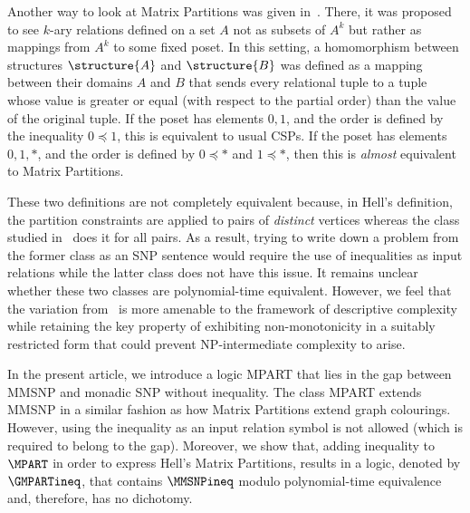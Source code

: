 \documentclass{lmcs}
\begin{document}
Another way to look at Matrix Partitions was given in~\cite{barsukovkante}.
%
There, it was proposed to see $k$-ary relations defined on a set $A$ not as subsets of $A^k$ but rather as mappings from $A^k$ to some fixed poset.
%
In this setting, a homomorphism between structures $\structure{A}$ and $\structure{B}$ was defined as a mapping between their domains $A$ and $B$ that sends every relational tuple to a tuple whose value is greater or equal (with respect to the partial order) than the value of the original tuple.
%
If the poset has elements $0,1$, and the order is defined by the inequality $0\preceq 1$, this is equivalent to usual CSPs.
%
If the poset has elements $0,1,\ast$, and the order is defined by $0\preceq \ast$ and $1\preceq \ast$, then this is \emph{almost} equivalent to Matrix Partitions.

These two definitions are not completely equivalent because, in Hell's definition, the partition constraints are applied to pairs of \emph{distinct} vertices whereas the class studied in~\cite{barsukovkante} does it for all pairs.
%
As a result, trying to write down a problem from the former class as an SNP sentence would require the use of inequalities as input relations while the latter class does not have this issue.
%
It remains unclear whether these two classes are polynomial-time equivalent.
%
However, we feel that the variation from~\cite{barsukovkante} is more amenable to the framework of descriptive complexity while retaining the key property of exhibiting non-monotonicity in a suitably restricted form that could prevent NP-intermediate complexity to arise.

In the present article, we introduce a logic MPART that lies in the gap between MMSNP and monadic SNP without inequality.
%
The class MPART extends MMSNP in a similar fashion as how Matrix Partitions extend graph colourings.
%
However, using the inequality as an input relation symbol is not allowed (which is required to belong to the gap).
%
Moreover, we show that, adding inequality to $\MPART$ in order to express Hell's Matrix Partitions, results in a logic, denoted by $\GMPARTineq$, that contains $\MMSNPineq$ modulo polynomial-time equivalence and, therefore, has no dichotomy.

\end{document}
